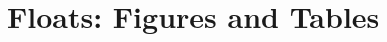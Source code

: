 \documentclass{beamer}
\begin{document}
\section{Floats: Figures and Tables}


% 


% 


% 
% 


% 
% 
% 
% 
% 
% 
% 

% 
% 
\end{document}
